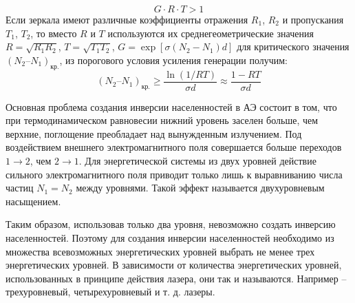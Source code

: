 \[ G\cdot R\cdot T > 1 \]
Если зеркала имеют различные коэффициенты отражения \( R_1 \), \( R_2 \) и 
пропускания \( T_1 \), \( T_2 \), то вместо \( R \) и \( T \) используются их 
среднегеометрические значения \( R = \sqrt{R_1 R_2} \), 
\( T = \sqrt{T_1 T_2} \), \( G = \exp[\sigma(N_2 - N_1)d] \)
для критического значения \( (N_2 – N_1)_\text{кр.} \), из порогового условия 
усиления генерации получим:
\[
	(N_2 – N_1)_\text{кр.} \geq \frac{\ln(1/RT)}{\sigma d} \approx
		\frac{1-RT}{\sigma d}
\]
 
Основная проблема создания инверсии населенностей в АЭ состоит в том, что при 
термодинамическом равновесии нижний уровень заселен больше, чем верхние, 
поглощение преобладает над вынужденным излучением. Под воздействием внешнего 
электромагнитного поля совершается больше переходов \( 1 \rightarrow 2 \), чем 
\( 2 \rightarrow 1\). Для энергетической системы из двух уровней действие 
сильного электромагнитного поля приводит только лишь к выравниванию числа 
частиц \( N_1 = N_2 \) между уровнями. Такой эффект называется двухуровневым 
насыщением.

Таким образом, использовав только два уровня, невозможно создать инверсию 
населенностей. Поэтому для создания инверсии населенностей необходимо из 
множества всевозможных энергетических уровней выбрать не менее трех 
энергетических уровней. В зависимости от количества энергетических уровней, 
использованных в принципе действия лазера, они так и называются. 
Например -- трехуровневый, четырехуровневый и т. д. лазеры.
